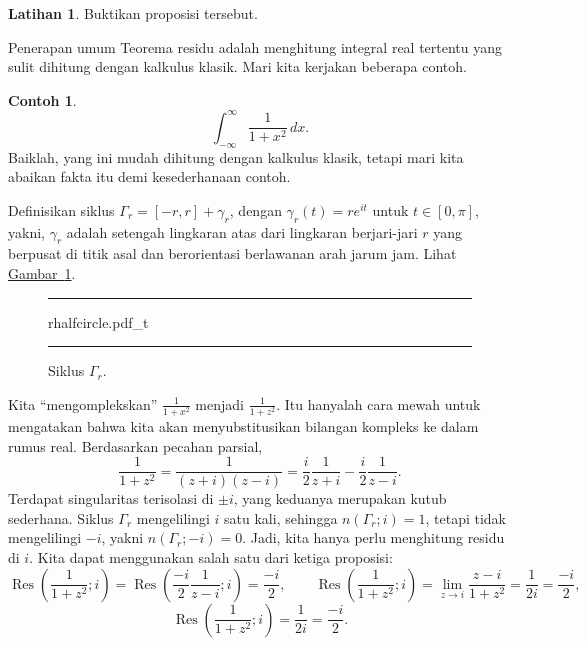 \documentclass[12pt,openany]{book}
\newcommand{\myquote}[1]{``#1''}
\theoremstyle{plain}
\theoremstyle{remark}
\theoremstyle{definition}
\newenvironment{exbox}{%
    \def\FrameCommand{\vrule width 1pt \relax\hspace{10pt}}%
    \MakeFramed{\advance\hsize-\width\FrameRestore}%
}{%
    \endMakeFramed
}
\newenvironment{myfig}{%
\begin{figure}[h!t]
\noindent\rule{\textwidth}{0.5pt}\vspace{12pt}\par\centering}%
{\par\noindent\rule{\textwidth}{0.5pt}
\end{figure}}
\theoremstyle{exercise}
\newtheorem{exercise}{Latihan}[section]
\theoremstyle{example}
\newtheorem{example}[thm]{Contoh}
\newcommand{\figureref}[1]{\hyperref[#1]{Gambar~\ref*{#1}}}
\begin{document}
\begin{exbox}
\begin{exercise}
Buktikan proposisi tersebut.
\end{exercise}
\end{exbox}

Penerapan umum Teorema residu adalah menghitung integral real tertentu
yang sulit dihitung dengan kalkulus klasik. Mari kita kerjakan
beberapa contoh.

\begin{example}
\begin{equation*}
\int_{-\infty}^\infty \frac{1}{1+x^2} \, dx .
\end{equation*}
Baiklah\@, yang ini mudah dihitung dengan kalkulus klasik, tetapi mari kita abaikan
fakta itu demi kesederhanaan contoh.

Definisikan siklus $\Gamma_r = [-r,r] + \gamma_r$, dengan $\gamma_r(t) =
re^{it}$ untuk $t \in [0,\pi]$, yakni, $\gamma_r$ adalah setengah lingkaran atas
dari lingkaran berjari-jari $r$ yang berpusat di titik asal dan berorientasi berlawanan arah jarum jam.
Lihat \figureref{fig:rhalfcircle}.

\begin{myfig}
{rhalfcircle.pdf_t}
\caption{Siklus $\Gamma_r$.\label{fig:rhalfcircle}}
\end{myfig}

Kita \myquote{mengomplekskan}
$\frac{1}{1+x^2}$ menjadi $\frac{1}{1+z^2}$.
Itu hanyalah cara mewah untuk mengatakan bahwa kita akan menyubstitusikan bilangan kompleks
ke dalam rumus real.
Berdasarkan pecahan parsial,
\begin{equation*}
\frac{1}{1+z^2} = \frac{1}{(z+i)(z-i)} =
\frac{i}{2} \frac{1}{z+i} -
\frac{i}{2} \frac{1}{z-i} .
\end{equation*}
Terdapat singularitas terisolasi di $\pm i$, yang keduanya merupakan kutub sederhana. Siklus
$\Gamma_r$ mengelilingi $i$ satu kali, sehingga $n(\Gamma_r;i) = 1$,
tetapi tidak mengelilingi $-i$, yakni $n(\Gamma_r;-i) = 0$.
Jadi, kita hanya perlu menghitung
residu di $i$. Kita dapat menggunakan salah satu dari ketiga proposisi:
\begin{equation*}
\operatorname{Res}\left(\frac{1}{1+z^2};i\right) =
\operatorname{Res}\left(
\frac{-i}{2} \frac{1}{z-i};
i\right) = \frac{-i}{2} ,
\qquad
\operatorname{Res}\left(\frac{1}{1+z^2};i\right) =
\lim_{z \to i} \frac{z-i}{1+z^2}
=
\frac{1}{2i} = \frac{-i}{2},
\end{equation*}
\begin{equation*}
\operatorname{Res}\left(\frac{1}{1+z^2};i\right) =
\frac{1}{2i} =
\frac{-i}{2} .
\end{equation*}


\end{example}
\end{document}
